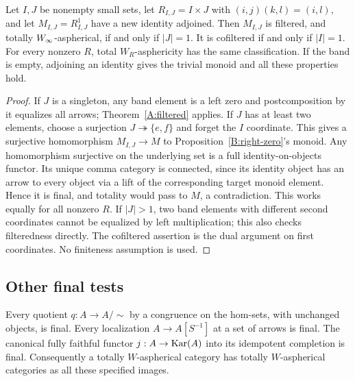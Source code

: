 \begin{proposition}\label{B:bands}
Let $I,J$ be nonempty small sets, let $R_{I,J}=I\times J$ with $(i,j)(k,l)=(i,l)$, and let $M_{I,J}=R_{I,J}^{1}$ have a new identity adjoined. Then $M_{I,J}$ is filtered, and totally $W_{\infty}$-aspherical, if and only if $|J|=1$. It is cofiltered if and only if $|I|=1$. For every nonzero $R$, total $W_R$-asphericity has the same classification. If the band is empty, adjoining an identity gives the trivial monoid and all these properties hold.
\end{proposition}

\begin{proof}
If $J$ is a singleton, any band element is a left zero and postcomposition by it equalizes all arrows; Theorem~\ref{A:filtered} applies. If $J$ has at least two elements, choose a surjection $J\twoheadrightarrow\{e,f\}$ and forget the $I$ coordinate. This gives a surjective homomorphism $M_{I,J}\to M$ to Proposition~\ref{B:right-zero}'s monoid. Any homomorphism surjective on the underlying set is a full identity-on-objects functor. Its unique comma category is connected, since its identity object has an arrow to every object via a lift of the corresponding target monoid element. Hence it is final, and totality would pass to $M$, a contradiction. This works equally for all nonzero $R$. If $|J|>1$, two band elements with different second coordinates cannot be equalized by left multiplication; this also checks filteredness directly. The cofiltered assertion is the dual argument on first coordinates. No finiteness assumption is used.
\end{proof}

\subsection{Other final tests}

\begin{proposition}\label{B:other-final}
Every quotient $q:A\to A/{\sim}$ by a congruence on the hom-sets, with unchanged objects, is final. Every localization $A\to A[S^{-1}]$ at a set of arrows is final. The canonical fully faithful functor $j:A\to\operatorname{Kar}(A)$ into its idempotent completion is final. Consequently a totally $W$-aspherical category has totally $W$-aspherical categories as all these specified images.
\end{proposition}

